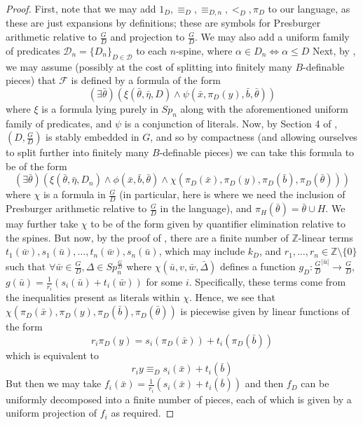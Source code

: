 \documentclass[a4paper,11pt]{article}
\renewcommand{\iff}{\Longleftrightarrow}
\newcommand{\nl}{\newline}
\newcommand{\Spn}{Sp_n}
\begin{document}
\begin{proof}
    First, note that we may add $1_D, \equiv_D, \equiv_{D,n}, <_D, \pi_D$ to our language, as these are just expansions by definitions; these are symbols for Presburger arithmetic relative to $\frac{G}{D}$ and projection to $\frac{G}{D}$. We may also add a uniform family of predicates $\mathcal{D}_n = \{D_n\}_{D\in\mathcal{D}}$ to each $n$-spine, where $\alpha\in D_n\iff\alpha\leq D$
    \nl\nl
    Next, by \cite{QE}, we may assume (possibly at the cost of splitting into finitely many $B$-definable pieces) that $\mathcal{F}$ is defined by a formula of the form
    $$(\exists\bar\theta)(\xi(\bar\theta, \bar\eta,D)\wedge\psi(\bar x, \pi_D(y), \bar b, \bar\theta))$$
    where $\xi$ is a formula lying purely in $\Spn$ along with the aforementioned uniform family of predicates, and $\psi$ is a conjunction of literals.%
    \nl\nl
    Now, by Section 4 of \cite{StableEmbeddedness}, $(D,\frac{G}{D})$ is stably embedded in $G$, and so by compactness (and allowing ourselves to split further into finitely many $B$-definable pieces) we can take this formula to be of the form
    $$(\exists\bar\theta)(\xi(\bar\theta, \bar\eta,D_n)\wedge\phi(\bar x, \bar b, \bar\theta)\wedge \chi(\pi_D(\bar x), \pi_D(y),\pi_D(\bar b), \pi_D(\bar\theta)))$$
    where $\chi$ is a formula in $\frac{G}{D}$ (in particular, here is where we need the inclusion of Presburger arithmetic relative to $\frac{G}{D}$ in the language), and $\pi_H(\bar\theta) = \bar\theta \cup H$.
    We may further take $\chi$ to be of the form given by quantifier elimination relative to the spines.
    \nl\nl
    But now, by the proof of , there are a finite number of $\mathbb{Z}$-linear terms $t_1(\bar w), s_1(\bar u), \dots, t_n(\bar w), s_n(\bar u)$, which may include $k_D$, and $r_1,\dots,r_n\in \mathbb{Z}\setminus\{0\}$ such that $\forall \bar w\in\frac{G}{D}, \Delta\in \Spn^{\frac{G}{D}}$ where $\chi(\bar u, v, \bar w, \bar\Delta)$ defines a function $g_D:\frac{G}{D}^{|\bar u|}\rightarrow\frac{G}{D}$, $g(\bar u) = \frac{1}{r_i}(s_i(\bar u) + t_i(\bar w))$ for some $i$. Specifically, these terms come from the inequalities present as literals within $\chi$.
    \nl\nl
    Hence, we see that $\chi(\pi_D(\bar x), \pi_D(y),\pi_D(\bar b), \pi_D(\bar\theta))$ is piecewise given by linear functions of the form
    $$r_i\pi_D(y) = s_i(\pi_D(\bar x)) + t_i(\pi_D(\bar b))$$
    which is equivalent to
    $$r_iy \equiv_D s_i(\bar x) + t_i(\bar b)$$
    But then we may take $f_i(\bar x) = \frac{1}{r_i}(s_i(\bar x) + t_i(\bar b))$ and then $f_D$ can be uniformly decomposed into a finite number of pieces, each of which is given by a uniform projection of $f_i$ as required.

    
\end{proof}
\end{document}
